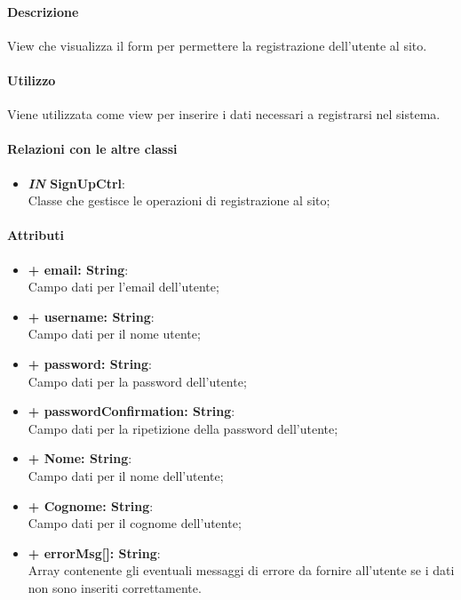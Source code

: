 	\paragraph{Descrizione}
	View che visualizza il form per permettere la registrazione dell'utente al sito.
	
	\paragraph{Utilizzo}
	Viene utilizzata come view per inserire i dati necessari a registrarsi nel sistema.
	
	\paragraph{Relazioni con le altre classi}
	\begin{itemize}
		\item \textbf{\textit{IN} SignUpCtrl}:\\
		Classe che gestisce le operazioni di registrazione al sito;
	\end{itemize}
	
	\paragraph{Attributi}
	\begin{itemize}
		\item \textbf{+ email: String}:\\
			Campo dati per l'email dell'utente;
		\item \textbf{+ username: String}:\\
			Campo dati per il nome utente;
		\item \textbf{+ password: String}:\\
			Campo dati per la password dell'utente;
		\item \textbf{+ passwordConfirmation: String}:\\
			Campo dati per la ripetizione della password dell'utente;
		\item \textbf{+ Nome: String}:\\
			Campo dati per il nome dell'utente;
		\item \textbf{+ Cognome: String}:\\
			Campo dati per il cognome dell'utente;		
		\item \textbf{+ errorMsg[]: String}:\\
			Array contenente gli eventuali messaggi di errore da fornire all'utente se i dati non sono inseriti correttamente.
	\end{itemize}
\newpage
	

